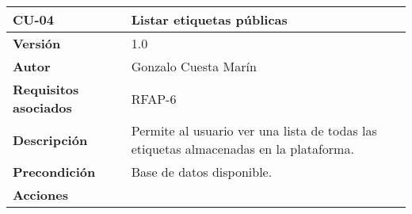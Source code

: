 \begin{longtable}[]{@{}ll@{}}
\toprule
\begin{minipage}[b]{0.22\columnwidth}\raggedright
\textbf{CU-04}\strut
\end{minipage} & \begin{minipage}[b]{0.72\columnwidth}\raggedright
\textbf{Listar etiquetas públicas}\strut
\end{minipage}\tabularnewline
\midrule
\endhead
\begin{minipage}[t]{0.22\columnwidth}\raggedright
\textbf{Versión}\strut
\end{minipage} & \begin{minipage}[t]{0.72\columnwidth}\raggedright
1.0\strut
\end{minipage}\tabularnewline
\begin{minipage}[t]{0.22\columnwidth}\raggedright
\textbf{Autor}\strut
\end{minipage} & \begin{minipage}[t]{0.72\columnwidth}\raggedright
Gonzalo Cuesta Marín\strut
\end{minipage}\tabularnewline
\begin{minipage}[t]{0.22\columnwidth}\raggedright
\textbf{Requisitos asociados}\strut
\end{minipage} & \begin{minipage}[t]{0.72\columnwidth}\raggedright
RFAP-6\strut
\end{minipage}\tabularnewline
\begin{minipage}[t]{0.22\columnwidth}\raggedright
\textbf{Descripción}\strut
\end{minipage} & \begin{minipage}[t]{0.72\columnwidth}\raggedright
Permite al usuario ver una lista de todas las etiquetas almacenadas en
la plataforma.\strut
\end{minipage}\tabularnewline
\begin{minipage}[t]{0.22\columnwidth}\raggedright
\textbf{Precondición}\strut
\end{minipage} & \begin{minipage}[t]{0.72\columnwidth}\raggedright
Base de datos disponible.\strut
\end{minipage}\tabularnewline
\begin{minipage}[t]{0.22\columnwidth}\raggedright
\textbf{Acciones}\strut
\end{minipage} & \begin{minipage}[t]{0.72\columnwidth}\raggedright
\begin{enumerate}

\end{enumerate}
\end{minipage}
\end{longtable}
